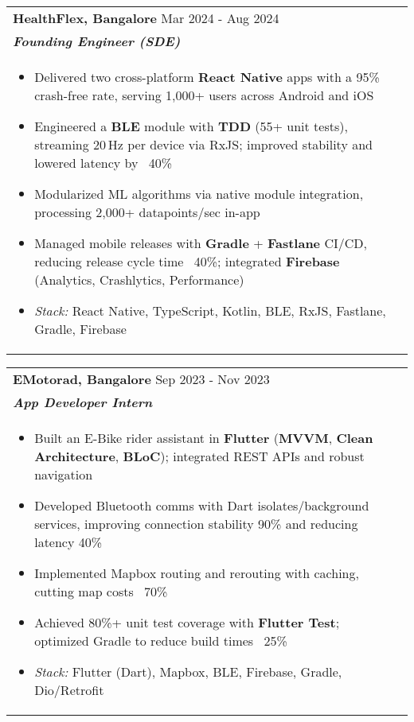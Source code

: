 \documentclass[a4paper,8pt]{article}
\begin{document}
\begin{tabularx}{\linewidth}{ @{}l r@{} }
\textbf{{HealthFlex, Bangalore}} \hfill \color[HTML]{371e77} Mar 2024 - Aug 2024 \\[4pt]
\color[HTML]{371e77}\textbf{\textit{Founding Engineer (SDE)}}\ \hfill \color[HTML]{4B28A4} \\[5pt]
\begin{minipage}[t]{\linewidth}
    \begin{itemize}[nosep,after=\strut, leftmargin=2em, itemsep=2pt]
        \item Delivered two cross-platform \textbf{React Native} apps with a 95\% crash-free rate, serving 1,000+ users across Android and iOS
        \item Engineered a \textbf{BLE} module with \textbf{TDD} (55+ unit tests), streaming 20\,Hz per device via RxJS; improved stability and lowered latency by ~40\%
        \item Modularized ML algorithms via native module integration, processing 2,000+ datapoints/sec in-app
        \item Managed mobile releases with \textbf{Gradle} + \textbf{Fastlane} CI/CD, reducing release cycle time ~40\%; integrated \textbf{Firebase} (Analytics, Crashlytics, Performance)
        \item \textit{Stack:} React Native, TypeScript, Kotlin, BLE, RxJS, Fastlane, Gradle, Firebase
    \end{itemize}
\end{minipage}
\end{tabularx}

\begin{tabularx}{\linewidth}{ @{}l r@{} }
\textbf{{EMotorad, Bangalore}} \hfill \color[HTML]{371e77} Sep 2023 - Nov 2023 \\[4pt]
\color[HTML]{371e77}\textbf{\textit{App Developer Intern}}\ \hfill \color[HTML]{4B28A4} \\[5pt]
\begin{minipage}[t]{\linewidth}
    \begin{itemize}[nosep,after=\strut, leftmargin=2em, itemsep=2pt]
        \item Built an E-Bike rider assistant in \textbf{Flutter} (\textbf{MVVM}, \textbf{Clean Architecture}, \textbf{BLoC}); integrated REST APIs and robust navigation
        \item Developed Bluetooth comms with Dart isolates/background services, improving connection stability 90\% and reducing latency 40\%
        \item Implemented Mapbox routing and rerouting with caching, cutting map costs ~70\%
        \item Achieved 80\%+ unit test coverage with \textbf{Flutter Test}; optimized Gradle to reduce build times ~25\%
        \item \textit{Stack:} Flutter (Dart), Mapbox, BLE, Firebase, Gradle, Dio/Retrofit
    \end{itemize}
\end{minipage}
\end{tabularx}
\end{document}
